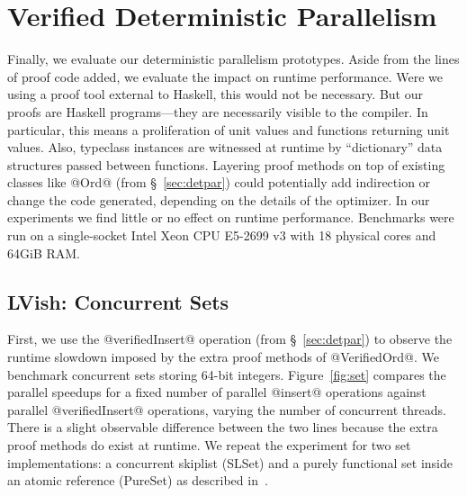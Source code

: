 \section{Verified Deterministic Parallelism}\label{sec:eval-parallelism}


Finally, we evaluate our deterministic
parallelism prototypes.  Aside from the lines of proof code added,
we evaluate the impact on runtime performance.
%
Were we using a proof tool external to Haskell, this would not be necessary.
But our proofs are Haskell programs---they are necessarily visible to the
compiler.  In particular, this means a proliferation of unit values and functions
returning unit values.  Also, typeclass instances are witnessed at runtime by
``dictionary'' data structures passed between functions.  Layering proof methods
on top of existing classes like @Ord@ (from \S~\ref{sec:detpar})
could potentially add indirection or change the
code generated, depending on the details of the optimizer.
%
%
In our experiments we find little or no effect on runtime performance.
Benchmarks were run on a single-socket Intel{\textregistered}
Xeon{\textregistered} CPU E5-2699 v3 with 18 physical cores and 64GiB RAM.

\subsection{LVish: Concurrent Sets}
\label{sec:set}

First, we use the @verifiedInsert@ operation (from \S~\ref{sec:detpar})
to observe the runtime slowdown imposed by the extra proof methods
of @VerifiedOrd@.
We benchmark concurrent sets storing 64-bit integers.
Figure~\ref{fig:set} compares the parallel speedups
for a fixed number of parallel @insert@ operations
against parallel @verifiedInsert@ operations, varying the number of concurrent
threads.
%
There is a slight observable difference between the two
lines because the extra proof methods do exist at runtime.
%
We repeat the experiment for two set implementations: a concurrent skiplist
(SLSet) and a purely functional set inside an atomic reference (PureSet) 
as described in~\cite{kuper2014freeze}.

